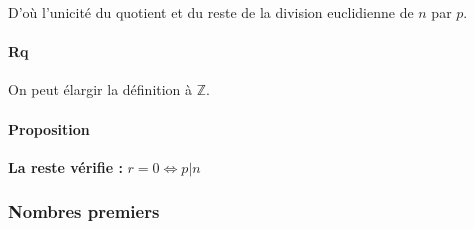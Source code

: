 \documentclass{report}
\newcommand{\Z}{\mathbb{Z}}
\begin{document}
\begin{tcolorbox}[colback=white, colframe=black, boxrule=0.8pt, width=1\textwidth]
\begin{itemize}
                    D'où l'unicité du quotient et du reste de la division euclidienne de $n$ par $p$.
            \end{itemize}
          
          \end{tcolorbox}

      \paragraph{Rq} On peut élargir la définition à $\Z$.

      \paragraph{Proposition} \textbf{La reste vérifie : } $\boxed{r=0 \iff p|n}$

      \subsubsection{Nombres premiers}
\end{document}
